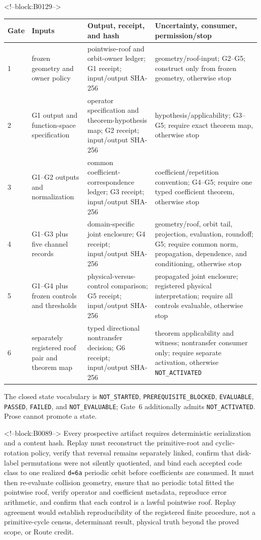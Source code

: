 \documentclass[11pt,a4paper]{article}
\begin{document}
<!--block:B0129-->
\begin{center}
\scriptsize
\begin{tabularx}{\linewidth}{@{}l p{.19\linewidth} p{.27\linewidth} X@{}}
\toprule
Gate & Inputs & Output, receipt, and hash & Uncertainty, consumer, permission/stop \\
\midrule
1 & frozen geometry and owner policy & pointwise-roof and orbit-owner ledger; G1 receipt; input/output SHA-256 & geometry/roof-input; G2--G5; construct only from frozen geometry, otherwise stop \\
2 & G1 output and function-space specification & operator specification and theorem-hypothesis map; G2 receipt; input/output SHA-256 & hypothesis/applicability; G3--G5; require exact theorem map, otherwise stop \\
3 & G1--G2 outputs and normalization & common coefficient-correspondence ledger; G3 receipt; input/output SHA-256 & coefficient/repetition convention; G4--G5; require one typed coefficient theorem, otherwise stop \\
4 & G1--G3 plus five channel records & domain-specific joint enclosure; G4 receipt; input/output SHA-256 & geometry/roof, orbit tail, projection, evaluation, roundoff; G5; require common norm, propagation, dependence, and conditioning, otherwise stop \\
5 & G1--G4 plus frozen controls and thresholds & physical-versus-control comparison; G5 receipt; input/output SHA-256 & propagated joint enclosure; registered physical interpretation; require all controls evaluable, otherwise stop \\
6 & separately registered roof pair and theorem map & typed directional nontransfer decision; G6 receipt; input/output SHA-256 & theorem applicability and witness; nontransfer consumer only; require separate activation, otherwise \texttt{NOT\_\allowbreak ACTIVATED} \\
\bottomrule
\end{tabularx}
\end{center}
The closed state vocabulary is \texttt{NOT\_\allowbreak STARTED},
\texttt{PREREQUISITE\_\allowbreak BLOCKED}, \texttt{EVALUABLE}, \texttt{PASSED},
\texttt{FAILED}, and \texttt{NOT\_\allowbreak EVALUABLE}; Gate~6 additionally admits
\texttt{NOT\_\allowbreak ACTIVATED}.  Prose cannot promote a state.

<!--block:B0089-->
Every prospective artifact requires deterministic serialization and a content hash. Replay must reconstruct the primitive-root and cyclic-rotation policy, verify that reversal remains separately linked, confirm that disk-label permutations were not silently quotiented, and bind each accepted code class to one realized \texttt{d=6a} periodic orbit before coefficients are consumed. It must then re-evaluate collision geometry, ensure that no periodic total fitted the pointwise roof, verify operator and coefficient metadata, reproduce error arithmetic, and confirm that each control is a lawful pointwise roof. Replay agreement would establish reproducibility of the registered finite procedure, not a primitive-cycle census, determinant result, physical truth beyond the proved scope, or Route credit.
\end{document}
